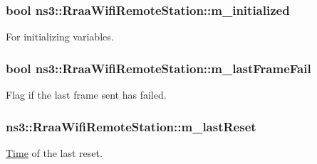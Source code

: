 \subsubsection[{\texorpdfstring{m\+\_\+initialized}{m_initialized}}]{\setlength{\rightskip}{0pt plus 5cm}bool ns3\+::\+Rraa\+Wifi\+Remote\+Station\+::m\+\_\+initialized}\hypertarget{structns3_1_1RraaWifiRemoteStation_a4fb5807b3401f2c5c98bae6ffd383d81}{}\label{structns3_1_1RraaWifiRemoteStation_a4fb5807b3401f2c5c98bae6ffd383d81}


For initializing variables. 

\subsubsection[{\texorpdfstring{m\+\_\+last\+Frame\+Fail}{m_lastFrameFail}}]{\setlength{\rightskip}{0pt plus 5cm}bool ns3\+::\+Rraa\+Wifi\+Remote\+Station\+::m\+\_\+last\+Frame\+Fail}\hypertarget{structns3_1_1RraaWifiRemoteStation_ab0907d37748a2f9a636a9a9b366d517d}{}\label{structns3_1_1RraaWifiRemoteStation_ab0907d37748a2f9a636a9a9b366d517d}


Flag if the last frame sent has failed. 

\subsubsection[{\texorpdfstring{m\+\_\+last\+Reset}{m_lastReset}}]{ ns3\+::\+Rraa\+Wifi\+Remote\+Station\+::m\+\_\+last\+Reset}\hypertarget{structns3_1_1RraaWifiRemoteStation_a318df9a99bc7895923b6ee7024bdf94b}{}\label{structns3_1_1RraaWifiRemoteStation_a318df9a99bc7895923b6ee7024bdf94b}


\hyperlink{classns3_1_1Time}{Time} of the last reset. 


